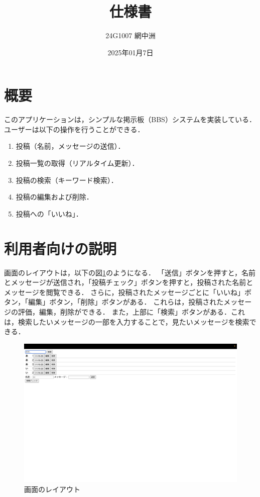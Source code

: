 \documentclass[uplatex,dvipdfmx]{jsarticle}
\begin{document}
\title{仕様書} %
\author{24G1007 網中洲}
\date{2025年01月7日}
\maketitle

\section{概要}
このアプリケーションは，シンプルな掲示板（BBS）システムを実装している．ユーザーは以下の操作を行うことができる．
\begin{enumerate}
  \item 投稿（名前，メッセージの送信）．
  \item 投稿一覧の取得（リアルタイム更新）．
  \item 投稿の検索（キーワード検索）．
  \item 投稿の編集および削除．
  \item 投稿への「いいね」．
\end{enumerate}

\section{利用者向けの説明}
画面のレイアウトは，以下の図\ref{reiauto}のようになる．
「送信」ボタンを押すと，名前とメッセージが送信され，「投稿チェック」ボタンを押すと，投稿された名前とメッセージを閲覧できる．
さらに，投稿されたメッセージごとに「いいね」ボタン，「編集」ボタン，「削除」ボタンがある．
これらは，投稿されたメッセージの評価，編集，削除ができる．
また，上部に「検索」ボタンがある．これは，検索したいメッセージの一部を入力することで，見たいメッセージを検索できる．

\begin{figure}[H]
  \centering
      \includegraphics[width=15cm]{Figs/reiauto.png}
      \caption{画面のレイアウト}
      \label{reiauto}
\end{figure}
\end{document}
